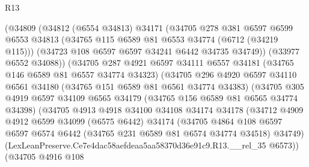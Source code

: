 \begin{lexlean}{R13}
\begin{coremodule}
                    (@34809
                      (@34812
                        (@6554 @34813)
                        @34171
                        (@34705
                          @278
                          @381
                          @6597
                          @6599
                          @6553
                          @34813
                          (@34765 @115 @6589 @81 @6553 @34774 (@6712 (@34219 @115)))
                          (@34723 @108 @6597 @6597 @34241 @6442 @34735 @34749))
                        (@33977 @6552 @34088))
                      (@34705
                        @287
                        @4921
                        @6597
                        @34111
                        @6557
                        @34181
                        (@34765 @146 @6589 @81 @6557 @34774 @34323)
                        (@34705
                          @296
                          @4920
                          @6597
                          @34110
                          @6561
                          @34180
                          (@34765 @151 @6589 @81 @6561 @34774 @34383)
                          (@34705
                            @305
                            @4919
                            @6597
                            @34109
                            @6565
                            @34179
                            (@34765 @156 @6589 @81 @6565 @34774 @34398)
                            (@34705
                              @4913
                              @4918
                              @34100
                              @34108
                              @34174
                              @34178
                              (@34712
                                @4909
                                @4912
                                @6599
                                @34099
                                (@6575 @6442)
                                @34174
                                (@34705
                                  @4864
                                  @108
                                  @6597
                                  @6597
                                  @6574
                                  @6442
                                  (@34765 @231 @6589 @81 @6574 @34774 @34518)
                                  @34749)
                                (LexLeanPreserve.Ce7e4dac58aefdeaa5aa58370d36e91c9.R13.__rel_35
                                  @6573))
                              (@34705
                                @4916
                                @108

\end{coremodule}
\end{lexlean}
